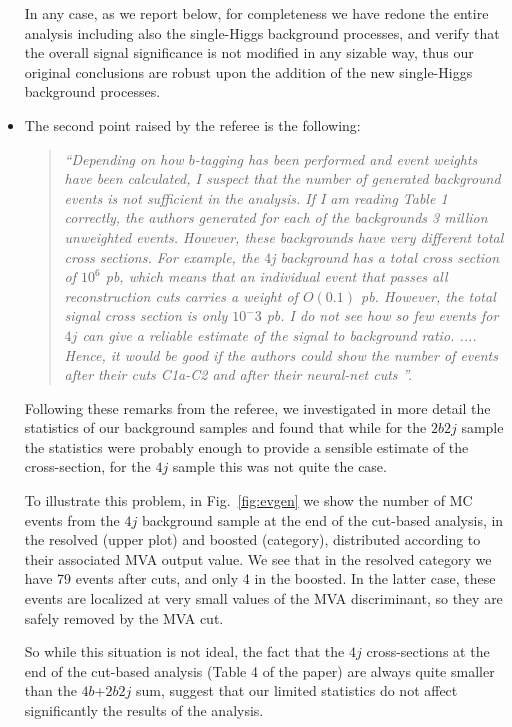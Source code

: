 \documentclass[11pt,a4paper]{article}
\begin{document}
\begin{itemize}
  In any case, as we report below, for completeness we have redone the entire analysis
  including also the single-Higgs background processes, and verify that
  the overall signal significance is not modified in any sizable way, thus our original
  conclusions are robust upon the addition of the new single-Higgs background processes.

\item The second point raised by the referee is the following:

  \begin{quote}
    \it ``Depending on how $b$-tagging has been performed and event weights have been calculated, I suspect that the number of generated background events is not sufficient in the analysis. If I am reading Table 1 correctly, the authors generated for each of the backgrounds 3 million unweighted events. However, these backgrounds have very different total cross sections. For example, the $4$j background has a total cross section of $10^6$ pb, which means that an individual event that passes all reconstruction cuts carries a weight of $O(0.1)$ pb. However, the total signal cross section is only $10^-3$ pb. I do not see how so few events for $4j$ can give a reliable estimate of the signal to background ratio. .... Hence, it would be good if the authors could show the number of events after their cuts C1a-C2 and after their neural-net cuts ''.
  \end{quote}

  Following these remarks from the referee, we investigated in more detail the statistics of our
  background samples and found that while for the $2b2j$ sample the statistics were probably
  enough to provide a sensible estimate of the cross-section, for the $4j$ sample this was not quite
  the case.

  To illustrate this problem, in Fig.~\ref{fig:evgen} we show
  the number of MC events from the $4j$ background sample at the end of
   the cut-based analysis, in the resolved (upper plot) and boosted (category), distributed
   according to their associated MVA output value.
   We see that in the resolved category we have 79 events after cuts, and only 4 in the boosted.
   In the latter case, these events are localized at very small values of the MVA discriminant,
   so they are safely removed by the MVA cut.

   
   So while this situation
   is not ideal, the fact that the $4j$ cross-sections at the end of the cut-based
   analysis (Table 4 of the paper) are always quite smaller than the $4b$+$2b2j$ sum, suggest that
   our limited statistics do not affect significantly the results of the analysis.




\end{itemize}
\end{document}
